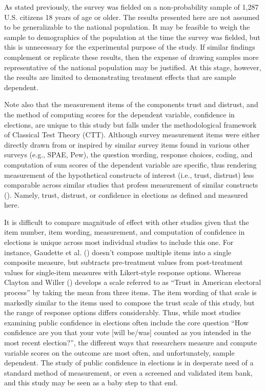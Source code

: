 \documentclass[
  12pt,
  letterpaper,
]{article}
\begin{document}
As stated previously, the survey was fielded on a non-probability sample
of 1,287 U.S. citizens 18 years of age or older. The results presented
here are not assumed to be generalizable to the national population. It
may be feasible to weigh the sample to demographics of the population at
the time the survey was fielded, but this is unnecessary for the
experimental purpose of the study. If similar findings complement or
replicate these results, then the expense of drawing samples more
representative of the national population may be justified. At this
stage, however, the results are limited to demonstrating treatment
effects that are sample dependent.

Note also that the measurement items of the components trust and
distrust, and the method of computing scores for the dependent variable,
confidence in elections, are unique to this study but falls under the
methodological framework of Classical Test Theory (CTT). Although survey
measurement items were either directly drawn from or inspired by similar
survey items found in various other surveys (e.g., SPAE, Pew), the
question wording, response choices, coding, and computation of sum
scores of the dependent variable are specific, thus rendering
measurement of the hypothetical constructs of interest (i.e., trust,
distrust) less comparable across similar studies that profess
measurement of similar constructs (). Namely, trust, distrust, or confidence in elections
as defined and measured here.

It is difficult to compare magnitude of effect with other studies given
that the item number, item wording, measurement, and computation of
confidence in elections is unique across most individual studies to
include this one. For instance, Gaudette et al.
() doesn't compose multiple items into
a single composite measure, but subtracts pre-treatment values from
post-treatment values for single-item measures with Likert-style
response options. Whereas Clayton and Willer
() develops a scale referred to as
``Trust in American electoral process'' by taking the mean from three
items. The item wording of that scale is markedly similar to the items
used to compose the trust scale of this study, but the range of response
options differs considerably. Thus, while most studies examining public
confidence in elections often include the core question ``How confidence
are you that your vote {[}will be/was{]} counted as you intended in the
most recent election?'', the different ways that researchers measure and
compute variable scores on the outcome are most often, and
unfortunately, sample dependent. The study of public confidence in
elections is in desperate need of a standard method of measurement, or
even a screened and validated item bank, and this study may be seen as a
baby step to that end.
\end{document}
